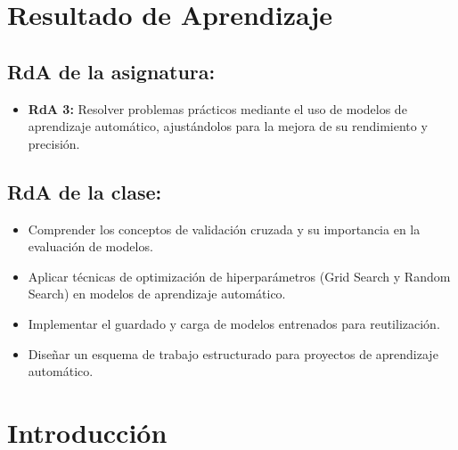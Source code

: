 \documentclass[a4,11pt]{aleph-notas}
\begin{document}
\encabezado


\section*{Resultado de Aprendizaje}

\subsection*{RdA de la asignatura:}
\begin{itemize}[leftmargin=*]
    \item \textbf{RdA 3:} 
    Resolver problemas prácticos mediante el uso de modelos de aprendizaje automático, ajustándolos para la mejora de su rendimiento y precisión.
\end{itemize}

\subsection*{RdA de la clase:}
\begin{itemize}[leftmargin=*]
    \item Comprender los conceptos de validación cruzada y su importancia en la evaluación de modelos.
    \item Aplicar técnicas de optimización de hiperparámetros (Grid Search y Random Search) en modelos de aprendizaje automático.
    \item Implementar el guardado y carga de modelos entrenados para reutilización.
    \item Diseñar un esquema de trabajo estructurado para proyectos de aprendizaje automático.
\end{itemize}

\section*{Introducción}
\end{document}

